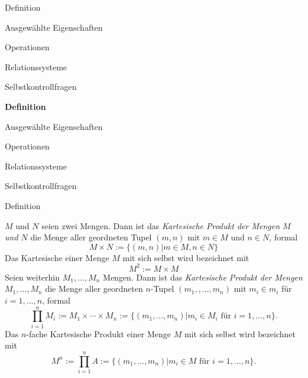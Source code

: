 \documentclass[
  8pt,
  ignorenonframetext,
]{beamer}
\begin{document}
\begin{frame}{}
\protect\hypertarget{section-2}{}
\vfill
\Large

Definition

Ausgewählte Eigenschaften

Operationen

Relationssysteme

Selbstkontrollfragen \vfill
\end{frame}

\begin{frame}{}
\protect\hypertarget{section-3}{}
\vfill
\Large

\textbf{Definition}

Ausgewählte Eigenschaften

Operationen

Relationssysteme

Selbstkontrollfragen \vfill
\end{frame}

\begin{frame}{Definition}
\protect\hypertarget{definition}{}
\footnotesize
\begin{definition}
\justifying
$M$ und $N$ seien zwei Mengen. Dann ist das \textit{Kartesische Produkt der Mengen
$M$ und $N$} die Menge aller geordneten Tupel $(m,n)$ mit $m \in M$ und $n \in N$,
formal
\begin{equation}
M \times N := \{(m,n)|m\in M, n\in N\}
\end{equation}
Das Kartesische einer Menge $M$ mit sich selbst wird bezeichnet mit
\begin{equation}
M^2 := M \times M
\end{equation}
Seien weiterhin $M_1,...,M_n$ Mengen. Dann ist das \textit{Kartesische Produkt
der Mengen $M_1,...,M_n$} die Menge aller geordneten $n$-Tupel $(m_1,,...,m_n)$
mit $m_i \in m_i$ für $i = 1,...,n$, formal
\begin{equation}
\prod_{i=1}^n M_i := M_1 \times \cdots \times M_n := \{(m_1,...,m_n)|m_i \in M_i \mbox{ für } i = 1,...,n\}.
\end{equation}
Das $n$-fache Kartesische Produkt einer Menge $M$ mit sich selbst wird bezeichnet mit
\begin{equation}
M^n := \prod_{i=1}^n A := \{(m_1,...,m_n)|m_i \in M \mbox{ für } i = 1,...,n\}.
\end{equation}
\end{definition}
\end{frame}
\end{document}
